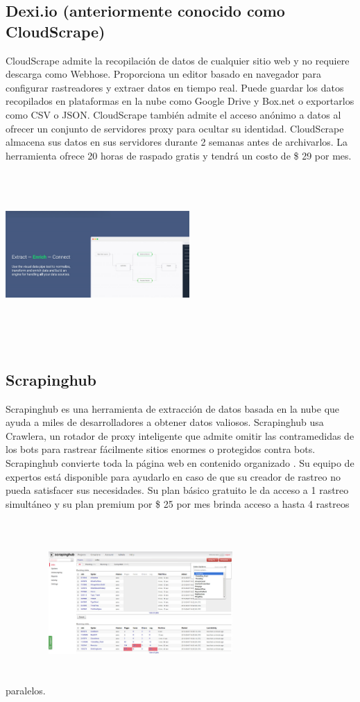 \documentclass[twoside,twocolumn]{article}
\begin{document}
\subsection{Dexi.io (anteriormente conocido como CloudScrape)}
CloudScrape admite la recopilación de datos de cualquier sitio web y no requiere 
descarga como Webhose. 
Proporciona un editor basado en navegador para configurar rastreadores 
y extraer datos en tiempo real. Puede guardar los datos recopilados en plataformas en la nube como Google Drive y Box.net o exportarlos como CSV o JSON.
CloudScrape también admite el acceso anónimo a datos al ofrecer un 
conjunto de servidores proxy para ocultar su identidad. CloudScrape 
almacena sus datos en sus servidores durante 2 semanas antes de archivarlos.
 La herramienta ofrece 20 horas de raspado gratis y tendrá un costo de \$ 29 por mes.
 \includegraphics[width=7cm, height=7cm]{imagenes/4.png}

\subsection{Scrapinghub}
Scrapinghub es una herramienta de extracción de datos basada en la nube 
que ayuda a miles de desarrolladores a obtener datos valiosos. Scrapinghub 
usa Crawlera, un rotador de proxy inteligente que admite omitir las contramedidas 
de los bots para rastrear fácilmente 
sitios enormes o protegidos contra bots.
Scrapinghub convierte toda la página web en contenido organizado .
 Su equipo de expertos está disponible para ayudarlo en caso de que 
 su creador de rastreo no pueda satisfacer sus necesidades. Su plan
  básico gratuito le da acceso a 1 rastreo simultáneo y su plan premium por 
  \$ 25 por mes brinda acceso a hasta 4 rastreos paralelos.
  \includegraphics[width=7cm, height=7cm]{imagenes/5.png}
\end{document}
